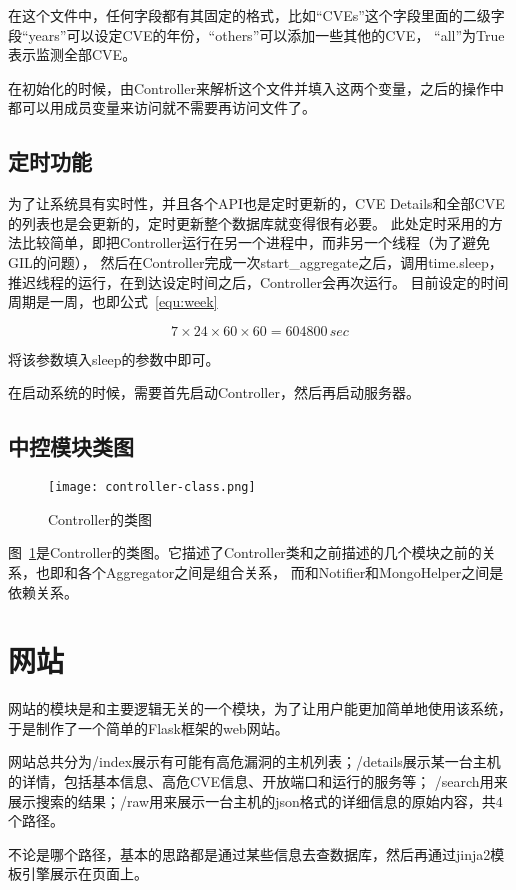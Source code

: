在这个文件中，任何字段都有其固定的格式，比如“CVEs”这个字段里面的二级字段“years”可以设定CVE的年份，“others”可以添加一些其他的CVE，
“all”为True表示监测全部CVE。

在初始化的时候，由Controller来解析这个文件并填入这两个变量，之后的操作中都可以用成员变量来访问就不需要再访问文件了。

\subsection{定时功能}
\label{sec:controller-timer}

为了让系统具有实时性，并且各个API也是定时更新的，CVE Details和全部CVE的列表也是会更新的，定时更新整个数据库就变得很有必要。
此处定时采用的方法比较简单，即把Controller运行在另一个进程中，而非另一个线程（为了避免GIL的问题），
然后在Controller完成一次start\_aggregate之后，调用time.sleep，推迟线程的运行，在到达设定时间之后，Controller会再次运行。
目前设定的时间周期是一周，也即公式~\ref{equ:week}

\begin{equation}
    \label{equ:week}
    7 \times 24 \times 60 \times 60 = 604800 \, sec
\end{equation}

将该参数填入sleep的参数中即可。

在启动系统的时候，需要首先启动Controller，然后再启动服务器。

\subsection{中控模块类图}
\label{sec:controller-class}

\begin{figure}[H]
    \centering
    \texttt{[image: controller-class.png]}
    \caption{Controller的类图}
    \label{fig:controller-class}
\end{figure}

图~\ref{fig:controller-class}是Controller的类图。它描述了Controller类和之前描述的几个模块之前的关系，也即和各个Aggregator之间是组合关系，
而和Notifier和MongoHelper之间是依赖关系。

\section{网站}
\label{sec:website}

网站的模块是和主要逻辑无关的一个模块，为了让用户能更加简单地使用该系统，于是制作了一个简单的Flask框架的web网站。

网站总共分为/index展示有可能有高危漏洞的主机列表；/details展示某一台主机的详情，包括基本信息、高危CVE信息、开放端口和运行的服务等；
/search用来展示搜索的结果；/raw用来展示一台主机的json格式的详细信息的原始内容，共4个路径。

不论是哪个路径，基本的思路都是通过某些信息去查数据库，然后再通过jinja2模板引擎展示在页面上。
